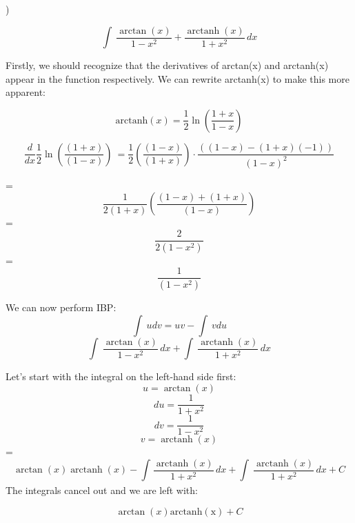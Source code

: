 \documentclass{article}
\begin{document}
)
\begin{flushleft}
\[\int\ \frac{\arctan\left(x\right)}{1-x^{2}}+\frac{\operatorname{arctanh}\left(x\right)}{1+x^{2}}\,dx\]

\noindent Firstly, we should recognize that the derivatives of arctan(x) and arctanh(x) appear in the function respectively. We can rewrite arctanh(x) to make this more apparent:

\[
\text{arctanh}(x) = \frac{1}{2}\ln\left(\frac{1+x}{1-x}\right)
\]

\[\frac{d}{dx} \frac{1}{2}\ln\left(\frac{\left(1+x\right)}{\left(1-x\right)}\right)\ = \frac{1}{2}\left(\frac{\left(1-x\right)}{\left(1+x\right)}\right)\cdot\frac{\left(\left(1-x\right)-\left(1+x\right)\left(-1\right)\right)}{\left(1-x\right)^{2}} \]

=\[\frac{1}{2\left(1+x\right)}\left(\frac{\left(1-x\right)+\left(1+x\right)}{\left(1-x\right)}\right)\]
=\[\frac{2}{2\left(1-x^{2}\right)}\]
=\[\frac{1}{\left(1-x^{2}\right)}\]

\noindent We can now perform IBP:
\[\int\ udv = uv-\int\ vdu \]
\[\int\ \frac{\arctan\left(x\right)}{1-x^{2}}\,dx + \int\ \frac{\operatorname{arctanh}\left(x\right)}{1+x^{2}}\,dx\]

\noindent Let's start with the integral on the left-hand side first:
\[u=\arctan\left(x\right)\]
\[du=\frac{1}{1+x^{2}}\]
\[dv=\frac{1}{1-x^{2}}\]
\[v=\operatorname{arctanh}\left(x\right)\]
=\[\arctan\left(x\right)\operatorname{arctanh}\left(x\right)-\int_{ }^{ }\frac{\operatorname{arctanh}\left(x\right)}{1+x^{2}}\,dx + \int\ \frac{\operatorname{arctanh}\left(x\right)}{1+x^{2}}\,dx + C\]
The integrals cancel out and we are left with:

\[\boxed{\arctan(x)\operatorname{arctanh(x)} + C}\]
\end{flushleft}
\end{document}
